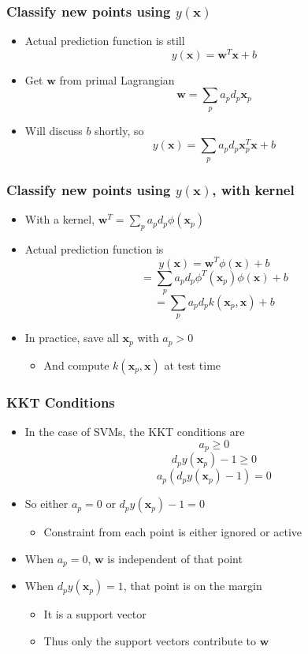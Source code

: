 \documentclass[12pt,notes,mathserif]{beamer}
\begin{document}
\begin{frame}[c]
\frametitle{Classify new points using $y(\mathbf{x})$}
\begin{itemize}
\item Actual prediction function is still
\[
y(\mathbf{x})=\mathbf{w}^T\mathbf{x}+b
\]
\item Get $\mathbf{w}$ from primal Lagrangian
\[
\mathbf{w}=\sum_pa_pd_p\mathbf{x}_p
\]
\item Will discuss $b$ shortly, so
\[
y(\mathbf{x})=\sum_pa_pd_p\mathbf{x}_p^T\mathbf{x}+b
\]
\end{itemize}
\end{frame}



\begin{frame}[c]
\frametitle{Classify new points using $y(\mathbf{x})$, with kernel}
\begin{itemize}
\item With a kernel, $\mathbf{w}^T=\sum_pa_pd_p\phi(\mathbf{x}_p)$
\item Actual prediction function is
\[
y(\mathbf{x})=\mathbf{w}^T\phi(\mathbf{x})+b
\]
\[
=\sum_pa_pd_p\phi^T(\mathbf{x}_p)\phi(\mathbf{x})+b
\]
\[
=\sum_pa_pd_pk(\mathbf{x}_p,\mathbf{x})+b
\]
\item In practice, save all $\mathbf{x}_p$ with $a_p> 0$
\begin{itemize}
\item And compute $k(\mathbf{x}_p,\mathbf{x})$ at test time
\end{itemize}
\end{itemize}
\end{frame}



\begin{frame}[c]
\frametitle{KKT Conditions}
\begin{itemize}
\item In the case of SVMs, the KKT conditions are
\[
a_p\geqslant{}0
\]
\[
d_py(\mathbf{x}_p)-1\geqslant{}0
\]
\[
a_p(d_py(\mathbf{x}_p)-1)=0
\]
\item So either $a_p=0$ or $d_py(\mathbf{x}_p)-1=0$
\begin{itemize}
\item Constraint from each point is either ignored or active
\end{itemize}
\item When $a_p=0$, $\mathbf{w}$ is independent of that point
\item When $d_py(\mathbf{x}_p)=1$, that point is on the margin
\begin{itemize}
\item It is a support vector
\item Thus only the support vectors contribute to $\mathbf{w}$
\end{itemize}
\end{itemize}
\end{frame}
\end{document}
